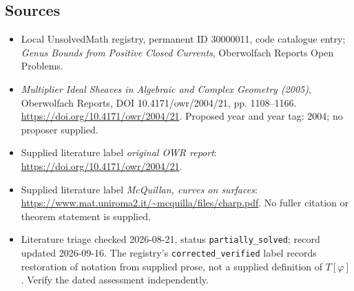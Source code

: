 \documentclass[11pt]{article}
\begin{document}
\subsection{Sources}
\begin{itemize}\item Local UnsolvedMath registry, permanent ID 30000011, code catalogue entry; \emph{Genus Bounds from Positive Closed Currents}, Oberwolfach Reports Open Problems.\item \emph{Multiplier Ideal Sheaves in Algebraic and Complex Geometry (2005)}, Oberwolfach Reports, DOI 10.4171/owr/2004/21, pp. 1108--1166. \url{https://doi.org/10.4171/owr/2004/21}. Proposed year and year tag: 2004; no proposer supplied.\item Supplied literature label \emph{original OWR report}: \url{https://doi.org/10.4171/owr/2004/21}.\item Supplied literature label \emph{McQuillan, curves on surfaces}: \url{https://www.mat.uniroma2.it/~mcquilla/files/charp.pdf}. No fuller citation or theorem statement is supplied.\item Literature triage checked 2026-08-21, status \texttt{partially\_solved}; record updated 2026-09-16. The registry's \texttt{corrected\_verified} label records restoration of notation from supplied prose, not a supplied definition of \(T[\varphi]\). Verify the dated assessment independently.\end{itemize}
\end{document}
